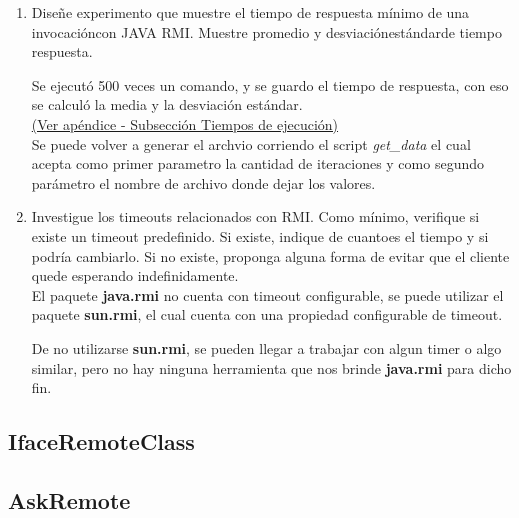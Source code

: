 \documentclass[12pt,journal,compsoc]{IEEEtran}
\begin{document}
\begin{enumerate}[label=\alph* -]
  \item Diseñe experimento que muestre el tiempo de respuesta mínimo de
  una invocacióncon JAVA RMI. Muestre promedio y desviaciónestándarde
  tiempo respuesta.

  Se ejecutó 500 veces un comando, y se guardo el tiempo de respuesta,
  con eso se calculó la media y la desviación estándar.\\

  \hyperref[section:times]{(Ver apéndice - Subsección Tiempos de ejecución)} \\

  Se puede volver a generar el archvio corriendo el script \textit{get\_data}
  el cual acepta como primer parametro la cantidad de iteraciones y como
  segundo parámetro el nombre de archivo donde dejar los valores.\\

  \item Investigue los timeouts relacionados con RMI. Como mínimo,
  verifique si existe un timeout predefinido. Si existe, indique de
  cuantoes el tiempo y si podría cambiarlo. Si no existe, proponga alguna
  forma de evitar que el cliente quede esperando indefinidamente.\\

  El paquete \textbf{java.rmi} no cuenta con timeout configurable,
  se puede utilizar el paquete \textbf{sun.rmi}, el cual cuenta con una
  propiedad configurable de timeout.

  De no utilizarse \textbf{sun.rmi}, se pueden llegar a trabajar con algun
  timer o algo similar, pero no hay ninguna herramienta que nos brinde 
  \textbf{java.rmi} para dicho fin.

\end{enumerate}

\newpage
\onecolumn
{}
\label{appendix:codigo-java}

\subsection{IfaceRemoteClass}
\label{section:IfaceRemoteClass}


\subsection{AskRemote}
\label{section:AskRemote}

\end{document}
